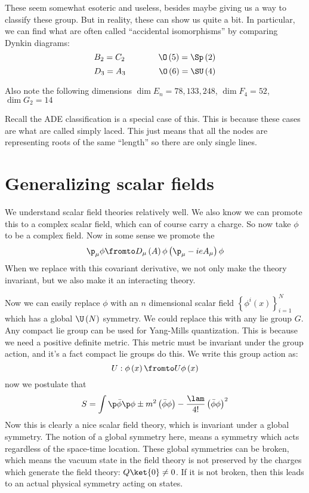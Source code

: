 \documentclass{booc}
\begin{document}
These seem somewhat esoteric and useless, besides maybe giving us 
a way to classify these group.
But in reality, these can show us quite a bit.
In particular, we can find what are often called ``accidental isomorphisms''
by comparing Dynkin diagrams:
\begin{equation}
B_2 = C_2
\qquad\qquad
\O\left( 5 \right) = \Sp\left( 2 \right)
\end{equation}
\begin{equation}
D_3 = A_3
\qquad\qquad
\O\left( 6 \right) = \SU\left( 4 \right)
\end{equation}

Also note the following dimensions
$\dim E_n = 78,133,248$, 
$\dim F_4 = 52$,
$\dim G_2 = 14$

Recall the ADE classification 
is a special case of this. 
This is because these cases are what are called simply laced. 
This just means that all the nodes are representing roots of the same  ``length''
so there are only single lines.

\section{Generalizing scalar fields}

We understand scalar field theories relatively well. 
We also know we can promote this to a complex scalar field, which
can of course carry a charge. 
So now take $\phi$ to be a complex field.
Now in some sense we promote the 
\begin{equation}
\p_\mu \phi \fromto 
D_\mu\left( A \right)\phi
\left( \p_\mu - i eA_\mu \right)\phi
\end{equation}
When we replace with this covariant derivative, 
we not only make the theory invariant, but we also
make it an interacting theory. 

Now we can easily replace $\phi$ with an $n$ dimensional scalar field 
$\left\{ \phi^i\left(  x\right) \right\}_{i=1}^N$
which has a global $\U\left( N \right)$ symmetry.
We could replace this with any lie group $G$.
Any compact lie group can be used for Yang-Mills quantization.
This is because we need a positive definite metric. 
This metric must be invariant under the group action,
and it's a fact compact lie groups do this.
We write this group action as:
\begin{equation}
U:\phi\left( x \right) \fromto U\phi\left( x \right)
\end{equation}
now we postulate that
\begin{equation}
S = 
\int \p \bar \phi \p \phi \pm
m^2\left( \bar \phi \phi \right) - 
\frac{\lam}{4!} \left( \bar \phi \phi \right)^2
\end{equation}
Now this is clearly a nice scalar field theory, which
is invariant under a global symmetry. 
The notion of a global symmetry here, means a symmetry which acts
regardless of the space-time location. 
These global symmetries can be broken, which means the vacuum state in the field theory
is not preserved by the charges which generate the field theory:
$Q\ket{0} \neq 0$.
If it is not broken, then this leads to an actual physical symmetry
acting on states. 
\end{document}
